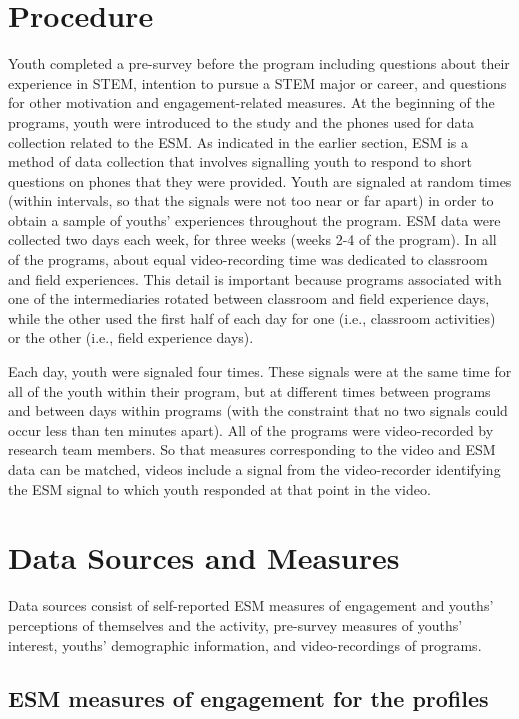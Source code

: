 \documentclass[]{book}
\theoremstyle{definition}
\theoremstyle{definition}
\theoremstyle{definition}
\theoremstyle{remark}
\begin{document}
\section{Procedure}\label{procedure}

Youth completed a pre-survey before the program including questions
about their experience in STEM, intention to pursue a STEM major or
career, and questions for other motivation and engagement-related
measures. At the beginning of the programs, youth were introduced to the
study and the phones used for data collection related to the ESM. As
indicated in the earlier section, ESM is a method of data collection
that involves signalling youth to respond to short questions on phones
that they were provided. Youth are signaled at random times (within
intervals, so that the signals were not too near or far apart) in order
to obtain a sample of youths' experiences throughout the program. ESM
data were collected two days each week, for three weeks (weeks 2-4 of
the program). In all of the programs, about equal video-recording time
was dedicated to classroom and field experiences. This detail is
important because programs associated with one of the intermediaries
rotated between classroom and field experience days, while the other
used the first half of each day for one (i.e., classroom activities) or
the other (i.e., field experience days).

Each day, youth were signaled four times. These signals were at the same
time for all of the youth within their program, but at different times
between programs and between days within programs (with the constraint
that no two signals could occur less than ten minutes apart). All of the
programs were video-recorded by research team members. So that measures
corresponding to the video and ESM data can be matched, videos include a
signal from the video-recorder identifying the ESM signal to which youth
responded at that point in the video.

\section{Data Sources and Measures}\label{data-sources-and-measures}

Data sources consist of self-reported ESM measures of engagement and
youths' perceptions of themselves and the activity, pre-survey measures
of youths' interest, youths' demographic information, and
video-recordings of programs.

\subsection{ESM measures of engagement for the
profiles}\label{esm-measures-of-engagement-for-the-profiles}
\end{document}
